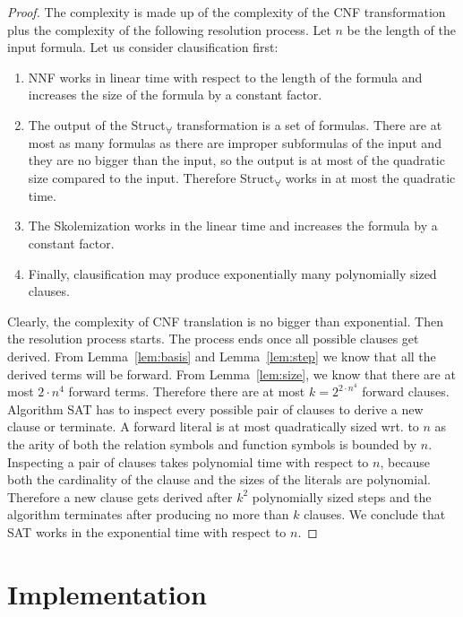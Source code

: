 \documentclass[english, shortabstract]{iithesis}
\theoremstyle{definition} \newtheorem{definition}{Definition}[chapter]
\theoremstyle{remark} \newtheorem{remark}[definition]{Observation}
\theoremstyle{plain} \newtheorem{theorem}[definition]{Theorem}
\theoremstyle{plain} \newtheorem{lemma}[definition]{Lemma}
\begin{document}
\begin{proof}
The complexity is made up of the complexity of the CNF transformation plus the complexity of the following resolution process.
Let $n$ be the length of the input formula.
Let us consider clausification first:
\begin{enumerate}
    \item NNF works in linear time with respect to the length of the formula and increases the size of the formula by a constant factor.
    \item The output of the Struct\textsubscript{{$\forall$}} transformation is a set of formulas. There are at most as many formulas as there are 
    improper subformulas of the input and they are no bigger than the input, so the output is at most of the quadratic size compared to the input.
    Therefore Struct\textsubscript{{$\forall$}} works in at most the quadratic time.
    \item The Skolemization works in the linear time and increases the formula by a constant factor.
    \item Finally, clausification may produce exponentially many polynomially sized clauses.
\end{enumerate}
Clearly, the complexity of CNF translation is no bigger than exponential.
Then the resolution process starts. The process ends once all possible clauses get derived.
From Lemma~\ref{lem:basis} and Lemma~\ref{lem:step} we know that all the derived terms will be forward.
From Lemma~\ref{lem:size}, we know that there are at most $2\cdot n^4$ forward terms. 
Therefore there are at most $k=2^{2\cdot n^4}$ forward clauses. 
Algorithm SAT has to inspect every possible pair of clauses to derive a new clause or terminate.
A forward literal is at most quadratically sized wrt. to $n$ as the arity of both the relation symbols and function symbols is bounded by $n$.
Inspecting a pair of clauses takes polynomial time with respect to $n$, because 
both the cardinality of the clause and the sizes of the literals are polynomial.
Therefore a new clause gets derived after $k^2$ polynomially sized steps and the algorithm terminates 
after producing no more than $k$ clauses. 
We conclude that SAT works in the exponential time with respect to $n$.
\end{proof}

\chapter{Implementation}
\end{document}
